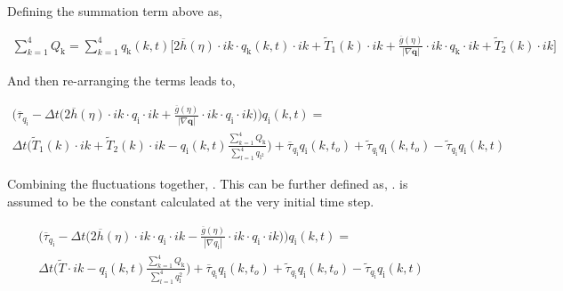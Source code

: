 \documentclass[a4paper,11pt,dvipsnames]{article}
\begin{document}
Defining the summation term above as, 

\begin{multline}
	\sum_{k = 1}^{4} Q_{\text{k}} = \sum_{k = 1}^{4} q_{\text{k}}(k,t) \biggl [ 2 \overline{h}(\eta) \cdot ik \cdot q_{\text{k}} (k,t) \cdot ik + \tilde{T}_1 (k) \cdot ik + \frac{\overline{g}(\eta)}{| \nabla \boldsymbol{q}| } \cdot ik \cdot q_{\text{k}} \cdot ik + \tilde{T}_2 (k) \cdot ik \biggr ] \label{eq:39}
\end{multline} 

And then re-arranging the terms leads to, 

\begin{multline}
	\biggl (  \overline{\tau}_{q_{\text{i}}} - \Delta t \biggl ( 2 \overline{h} (\eta) \cdot ik \cdot q_{\text{i}} \cdot ik  + \frac{\overline{g}(\eta)}{| \nabla \boldsymbol{q} | } \cdot ik \cdot q_{\text{i}} \cdot ik \biggr ) \biggr ) q_{\text{i}} (k,t) = \\ 
	\Delta t \biggl ( \tilde{T}_1 (k) \cdot ik + \tilde{T}_2 (k) \cdot ik - q_{\text{i}}(k,t) \frac{\sum_{k = 1}^{4} Q_{\text{k}} }{\sum_{l = 1}^{4} q_{\text{l}^{2}}} \biggr ) + \overline{\tau}_{q_{\text{i}}} q_{\text{i}}(k,t_{o}) + \tilde{\tau}_{q_{\text{i}}} q_{\text{i}}(k,t_o) - \tilde{\tau}_{q_{\text{i}}} q_{\text{i}}(k,t) \label{eq:40}
\end{multline}

Combining the fluctuations together, . This can be further defined as, .  is assumed to be the constant  calculated at the very initial time step. 

\begin{multline}
	\biggl ( \overline{\tau}_{q_{\text{i}}} - \Delta t \biggl ( 2 \overline{h} (\eta) \cdot ik \cdot q_{\text{i}} \cdot ik - \frac{\overline{g}(\eta)}{| \nabla q_{\text{i}}| } \cdot ik \cdot q_{\text{i}} \cdot ik \biggr ) \biggr ) q_{\text{i}} (k,t) = \\ 
	\Delta t \biggl ( \tilde{T} \cdot ik - q_{\text{i}}(k,t) \frac{\sum_{k = 1}^{4} Q_{\text{k}}}{\sum_{l = 1}^{4} q_{\text{l}}^2} \biggr ) +  \overline{\tau}_{q_{\text{i}}} q_{\text{i}}(k,t_{o}) + \tilde{\tau}_{q_{\text{i}}} q_{\text{i}}(k,t_o) - \tilde{\tau}_{q_{\text{i}}} q_{\text{i}}(k,t) \label{eq:41} 
\end{multline}
\end{document}
